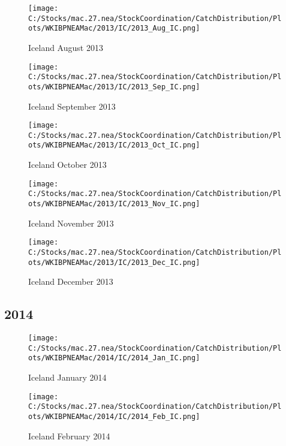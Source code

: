 \documentclass{article}
\begin{document}
\begin{figure}
	\centering
		\texttt{[image: C:/Stocks/mac.27.nea/StockCoordination/CatchDistribution/Plots/WKIBPNEAMac/2013/IC/2013\_Aug\_IC.png]}
	\caption{Iceland August 2013}
	\label{fig:2013_Aug_IC}
\end{figure}

\begin{figure}
	\centering
		\texttt{[image: C:/Stocks/mac.27.nea/StockCoordination/CatchDistribution/Plots/WKIBPNEAMac/2013/IC/2013\_Sep\_IC.png]}
	\caption{Iceland September 2013}
	\label{fig:2013_Sep_IC}
\end{figure}

\begin{figure}
	\centering
		\texttt{[image: C:/Stocks/mac.27.nea/StockCoordination/CatchDistribution/Plots/WKIBPNEAMac/2013/IC/2013\_Oct\_IC.png]}
	\caption{Iceland October 2013}
	\label{fig:2013_Oct_IC}
\end{figure}

\begin{figure}
	\centering
		\texttt{[image: C:/Stocks/mac.27.nea/StockCoordination/CatchDistribution/Plots/WKIBPNEAMac/2013/IC/2013\_Nov\_IC.png]}
	\caption{Iceland November 2013}
	\label{fig:2013_Nov_IC}
\end{figure}

\begin{figure}
	\centering
		\texttt{[image: C:/Stocks/mac.27.nea/StockCoordination/CatchDistribution/Plots/WKIBPNEAMac/2013/IC/2013\_Dec\_IC.png]}
	\caption{Iceland December 2013}
	\label{fig:2013_Dec_IC}
\end{figure}

\clearpage

\newpage

\subsection{2014}



\begin{figure}[h]
	\centering
		\texttt{[image: C:/Stocks/mac.27.nea/StockCoordination/CatchDistribution/Plots/WKIBPNEAMac/2014/IC/2014\_Jan\_IC.png]}
	\caption{Iceland January 2014}
	\label{fig:2014_Jan_IC}
\end{figure}

\begin{figure}
	\centering
		\texttt{[image: C:/Stocks/mac.27.nea/StockCoordination/CatchDistribution/Plots/WKIBPNEAMac/2014/IC/2014\_Feb\_IC.png]}
	\caption{Iceland February 2014}
	\label{fig:2014_Feb_IC}
\end{figure}
\end{document}

